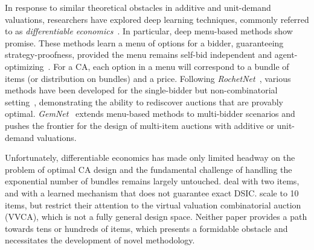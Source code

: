 In response to similar theoretical obstacles in additive and unit-demand valuations, researchers have explored deep learning techniques, commonly referred to as \emph{differentiable economics}~\cite{dutting2024optimal}. In particular, deep menu-based methods show promise. These methods learn a menu of options for a bidder, guaranteeing strategy-proofness, provided the menu remains self-bid independent and agent-optimizing~\citep{hammond1979straightforward}. 
For a CA, each option in a menu will correspond to a bundle of items (or distribution on bundles) and a price. Following {\em RochetNet}~\cite{dutting2024optimal}, various methods have been developed for the single-bidder but non-combinatorial setting~\cite{curry2022differentiable,duan2023scalable,shen2019automated,dutting2024optimal}, demonstrating
the ability to rediscover auctions that are provably optimal. {\em GemNet}~\cite{wang2024gemnet} extends menu-based methods to multi-bidder scenarios and pushes the frontier for the design of multi-item auctions with additive or unit-demand
valuations. 

Unfortunately, differentiable economics has made only limited headway on the problem of optimal CA design and the fundamental challenge of handling the exponential number of bundles remains largely untouched. \citet{dutting2024optimal} deal with two items, and with a learned mechanism that does not guarantee exact DSIC. \citet{duan2024scalable} scale to 10 items, but restrict their attention to  the virtual valuation combinatorial auction (VVCA), which is not a fully general design space. Neither paper provides a path towards  tens or hundreds of items, 
which presents a formidable obstacle and necessitates the development of novel methodology.
%


